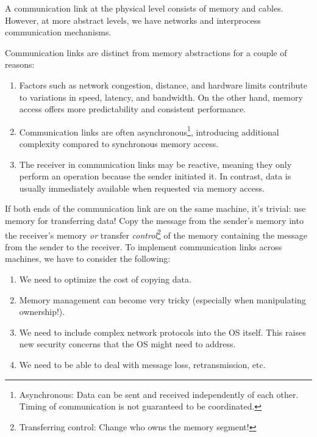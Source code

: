 \documentclass{report}
\newcommand{\asideBegin}[1]{\begin{tcolorbox}[colback=orange!5!white,colframe=black!75!orange,title={Aside:
      #1}]}
\newcommand{\asideEnd}{\end{tcolorbox}}
\begin{document}
\begin{tcolorbox}[colback=violet!5!white,colframe=violet,title=Abstraction: Communication Links] 
  A communication link at the physical level consists of memory and cables. However, at more
  abstract levels, we have networks and interprocess communication mechanisms.
\end{tcolorbox}

Communication links are distinct from memory abstractions for a couple of reasons:
\begin{enumerate}[label=\textit{(\roman*)}]
\item Factors such as network congestion, distance, and hardware limits contribute to variations in
  speed, latency, and bandwidth. On the other hand, memory access offers more predictability and
  consistent performance.  

\item Communication links are often asynchronous\footnote{Asynchronous: Data can be sent and
    received independently of each other. Timing of communication is not guaranteed to be
    coordinated.}, introducing additional complexity compared to synchronous memory access. 

\item The receiver in communication links may be reactive, meaning they only perform an operation
  because the sender initiated it. In contrast, data is usually immediately available when requested
  via memory access. 
\end{enumerate}


\asideBegin{Implementation}
If both ends of the communication link are on the same machine, it's trivial: use memory for
transferring data! Copy the message from the sender's memory into the receiver's memory \textit{or}
transfer \textit{control}\footnote{Transferring control: Change who owns the memory segment!} of the memory
containing the message from the sender to the receiver. To implement communication links across
machines, we have to consider the following:

\begin{enumerate}[label=\textit{(\roman*)}]
\item We need to optimize the cost of copying data.
\item Memory management can become very tricky (especially when manipulating ownership!).
\item We need to include complex network protocols into the OS itself. This raises new security
  concerns that the OS might need to address.
\item We need to be able to deal with message loss, retransmission, etc.
\end{enumerate}
\asideEnd
\end{document}
